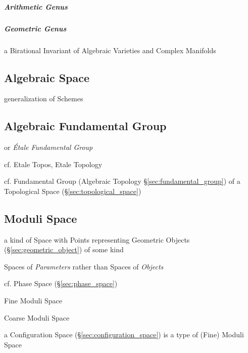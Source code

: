 \subparagraph{Arithmetic Genus}\label{sec:arithmetic_genus}\hfill

\subparagraph{Geometric Genus}\label{sec:geometric_genus}\hfill

a Birational Invariant of Algebraic Varieties and Complex Manifolds



\subsection{Algebraic Space}\label{sec:algebraic_space}

generalization of Schemes



\subsection{Algebraic Fundamental Group}\label{sec:algebraic_fundamental_group}

or \emph{\'Etale Fundamental Group}

cf. Etale Topos, Etale Topology

cf. Fundamental Group (Algebraic Topology \S\ref{sec:fundamental_group}) of a
Topological Space (\S\ref{sec:topological_space})



\subsection{Moduli Space}\label{sec:moduli_space}

a kind of Space with Points representing Geometric Objects
(\S\ref{sec:geometric_object}) of some kind

Spaces of \emph{Parameters} rather than Spaces of \emph{Objects}

cf. Phase Space (\S\ref{sec:phase_space})

Fine Moduli Space

Coarse Moduli Space

a Configuration Space (\S\ref{sec:configuration_space}) is a type of (Fine)
Moduli Space



